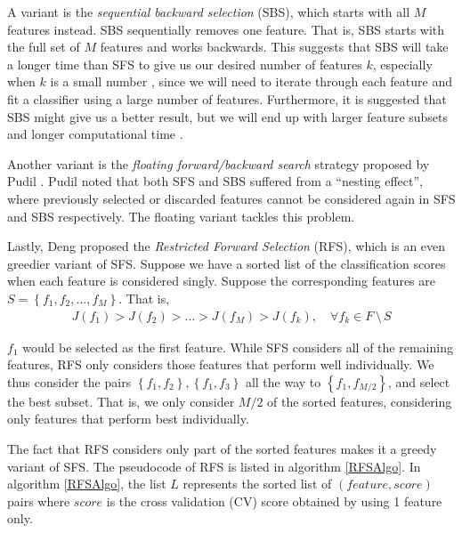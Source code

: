 \documentclass[12pt, twoside, a4paper]{report}
\begin{document}
A variant is the \textit{sequential backward selection} (SBS), which starts with all $M$ features instead. SBS sequentially removes one feature. That is, SBS starts with the full set of $M$ features and works backwards. This suggests that SBS will take a longer time than SFS to give us our desired number of features $k$, especially when $k$ is a small number \cite{RefWorks:190}, since we will need to iterate through each feature and fit a classifier using a large number of features. Furthermore, it is suggested that SBS might give us a better result, but we will end up with larger feature subsets and longer computational time \cite{RefWorks:208}.

Another variant is the \textit{floating forward/backward search} strategy proposed by Pudil \cite{RefWorks:178}. Pudil noted that both SFS and SBS suffered from a ``nesting effect'', where previously selected or discarded features cannot be considered again in SFS and SBS respectively. The floating variant tackles this problem.

Lastly, Deng \cite{deng1998omega} proposed the \textit{Restricted Forward Selection} (RFS), which is an even greedier variant of SFS. Suppose we have a sorted list of the classification scores when each feature is considered singly. Suppose the corresponding features are $S =\left\lbrace f_1, f_2, \dots , f_M \right\rbrace$. That is,
\begin{align*}
J(f_1) > J(f_2) > \dots > J(f_M) > J(f_k), \quad \forall f_k \in F \, \setminus \, S
\end{align*}

$f_1$ would be selected as the first feature. While SFS considers all of the remaining features, RFS only considers those features that perform well individually. We thus consider the pairs $\left\lbrace f_1, f_2 \right\rbrace, \left\lbrace f_1, f_3 \right\rbrace$ all the way to $\left\lbrace f_1, f_{M/2} \right\rbrace$, and select the best subset. That is, we only consider $M/2$ of the sorted features, considering only features that perform best individually.

The fact that RFS considers only part of the sorted features makes it a greedy variant of SFS. The pseudocode of RFS is listed in algorithm \ref{RFSAlgo}. In algorithm \ref{RFSAlgo}, the list $L$ represents the sorted list of $(feature, score)$ pairs where $score$ is the cross validation (CV) score obtained by using 1 feature only.
\end{document}
